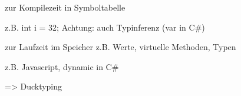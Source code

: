 %
%
 zur Kompilezeit in Symboltabelle

z.B. int i = 32;  
Achtung: auch Typinferenz (var in C\#)

 zur Laufzeit im Speicher z.B. Werte, virtuelle Methoden, Typen

z.B. Javascript, dynamic in C\# 

=> Ducktyping

%
%
